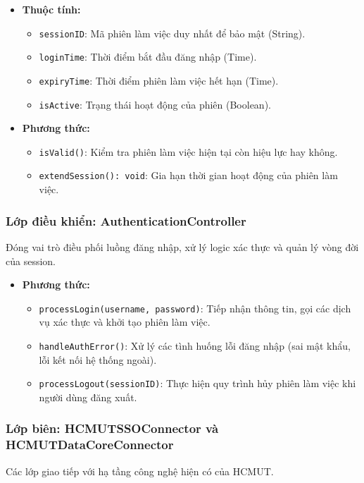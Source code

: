 \begin{itemize}
    \item \textbf{Thuộc tính:}
    \begin{itemize}
        \item \texttt{sessionID}: Mã phiên làm việc duy nhất để bảo mật (String).
        \item \texttt{loginTime}: Thời điểm bắt đầu đăng nhập (Time).
        \item \texttt{expiryTime}: Thời điểm phiên làm việc hết hạn (Time).
        \item \texttt{isActive}: Trạng thái hoạt động của phiên (Boolean).
    \end{itemize}
    \item \textbf{Phương thức:}
    \begin{itemize}
        \item \texttt{isValid()}: Kiểm tra phiên làm việc hiện tại còn hiệu lực hay không.
        \item \texttt{extendSession(): void}: Gia hạn thời gian hoạt động của phiên làm việc.
    \end{itemize}
\end{itemize}

\subsubsection{Lớp điều khiển: AuthenticationController}
Đóng vai trò điều phối luồng đăng nhập, xử lý logic xác thực và quản lý vòng đời của session.

\begin{itemize}
    \item \textbf{Phương thức:}
    \begin{itemize}
        \item \texttt{processLogin(username, password)}: Tiếp nhận thông tin, gọi các dịch vụ xác thực và khởi tạo phiên làm việc.
        \item \texttt{handleAuthError()}: Xử lý các tình huống lỗi đăng nhập (sai mật khẩu, lỗi kết nối hệ thống ngoài).
        \item \texttt{processLogout(sessionID)}: Thực hiện quy trình hủy phiên làm việc khi người dùng đăng xuất.
    \end{itemize}
\end{itemize}

\subsubsection{Lớp biên: HCMUTSSOConnector và HCMUTDataCoreConnector}
Các lớp giao tiếp với hạ tầng công nghệ hiện có của HCMUT.

